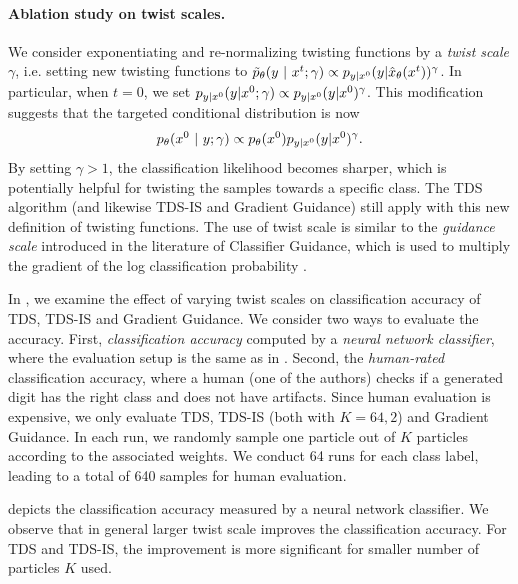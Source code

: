 \paragraph{Ablation study on twist scales.} We consider exponentiating and re-normalizing twisting functions by a \emph{twist scale} $\gamma$, i.e. setting new twisting functions to $\tilde{p}_{\theta} (y ~\vert~ x^{t}; \gamma) \propto p_{y|x^{0}}({y}|{{\hat x}_\theta(x^{t})})^\gamma$. In particular, when $t=0$, we set $p_{y|x^{0}}({y}|{ x^{0};\gamma})   \propto p_{y|x^{0}}({y }|{x^{0}})^\gamma$. This modification suggests that the targeted conditional distribution is now  
\begin{align}
    p_{\theta} (x^{0} ~\vert~ y; \gamma) \propto p_{\theta}( x^{0} ) p_{y|x^{0}}({y}|{x^{0}})^\gamma . 
\end{align}
By setting $\gamma > 1$, the classification likelihood becomes sharper, which is potentially helpful for twisting the samples towards a specific class. 
The TDS algorithm (and likewise TDS-IS and Gradient Guidance) still apply with this new definition of twisting functions.
The use of twist scale is similar to the \emph{guidance scale} introduced in the literature of Classifier Guidance, which is used to multiply the gradient of the log classification probability \citep{dhariwal2021diffusion}. 


In , we examine the effect of varying twist scales on classification accuracy of TDS, TDS-IS and Gradient Guidance. We consider two ways to evaluate the accuracy. First, \emph{classification accuracy} computed by a \emph{neural network classifier}, where the evaluation setup is the same as in . Second, the \emph{human-rated} classification accuracy, where a human (one of the authors) checks if a generated digit has the right class and does not have artifacts. 
Since human evaluation is expensive, we only evaluate TDS, TDS-IS (both with $K= 64, 2$) and Gradient Guidance. In each  run, we randomly sample one particle out of $K$ particles according to the associated weights. We conduct 64 runs for each class label, leading to a total of 640 samples for human evaluation.


 depicts the classification accuracy measured by a neural network classifier. We observe that in general larger twist scale improves the classification accuracy. For TDS and TDS-IS, the improvement is more significant for smaller number of particles $K$ used. 

